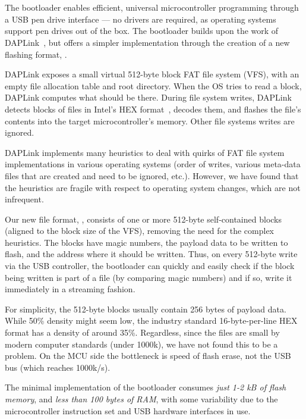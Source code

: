 \section{\UF}
\label{sec:uf2}

The \UF bootloader enables efficient, universal microcontroller programming through a USB pen drive interface --- no drivers are required, as operating systems support pen drives out of the box. The \UF bootloader builds upon the work of DAPLink~\cite{GitHubAR5:online}, but offers a simpler implementation through the creation of a new flashing format, \UFN.

DAPLink exposes a small virtual 512-byte block FAT file system (VFS), with an empty file allocation table and root directory. When the OS tries to read a block, DAPLink computes what should be there. During file system writes, DAP\-Link detects blocks of files in Intel's HEX format~\cite{IntelHEX}, decodes them, and flashes the file's contents into the target microcontroller's memory. Other file systems writes are ignored.

DAPLink implements many heuristics to deal with quirks of FAT file
system implementations in various operating systems (order of writes, various meta-data files that are created and need to be ignored, etc.).  However, we have found that the heuristics are fragile with respect to operating system changes, which are not infrequent.

Our new file format, \UFN, consists of one or more 512-byte self-contained blocks (aligned to the block size of the VFS), removing the need for the complex heuristics. The blocks have magic numbers, the payload data to be written to flash, and the address where it should be written. Thus, on every 512-byte write via the USB controller, the bootloader can quickly and easily check if the block being written is part of a \UF file (by comparing magic numbers) and if so, write it immediately in a streaming fashion.

For simplicity, the 512-byte \UF blocks usually contain 256 bytes of payload data. While 50\% density might seem low, the industry standard 16-byte-per-line HEX format has a density of around 35\%. Regardless, since the files are small by modern computer standards (under 1000k), we have not found this to be a problem. On the MCU side the bottleneck is speed of flash erase, not the USB bus (which reaches 1000k/s).

The minimal implementation of the \UF bootloader consumes \emph{just 1-2 kB of flash memory}, and \emph{less than 100 bytes of RAM}, with some variability due to the microcontroller instruction set and USB hardware interfaces in use.

